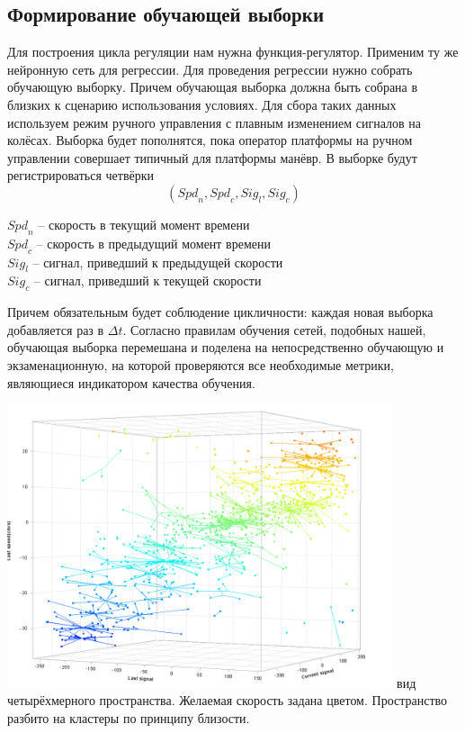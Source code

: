 \documentclass[14pt]{extreport}
\begin{document}
            \subsection{Формирование обучающей выборки}
                Для построения цикла регуляции нам нужна функция-регулятор. Применим ту же нейронную сеть для регрессии. Для проведения регрессии нужно собрать обучающую выборку. Причем обучающая выборка должна быть собрана в близких к сценарию использования условиях. Для сбора таких данных используем режим ручного управления с плавным изменением сигналов на колёсах. Выборка будет пополнятся, пока оператор платформы на ручном управлении совершает типичный для платформы манёвр. В выборке будут регистрироваться четвёрки
                    \[({Spd}_n,{Spd}_c,{Sig}_l,{Sig}_c)\]
                    \begin{center}
                      \({Spd}_n\) -- скорость в текущий момент времени\\
                      \({Spd}_c\) -- скорость в предыдущий момент времени\\
                      \({Sig}_l\) -- сигнал, приведший к предыдущей скорости\\
                      \({Sig}_c\) -- сигнал, приведший к текущей скорости\\
                    \end{center}
                Причем обязательным будет соблюдение цикличности: каждая новая выборка добавляется раз в $\Delta t$.
                Согласно правилам обучения сетей, подобных нашей, обучающая выборка перемешана и поделена на непосредственно обучающую и экзаменационную, на которой проверяются все необходимые метрики, являющиеся индикатором качества обучения.
                
                \begin{center}
                        \includegraphics[width=0.85\textwidth]{clust1}
                         вид четырёхмерного пространства. Желаемая скорость задана цветом. Пространство разбито на кластеры по принципу близости.
                \end{center}
                
\end{document}
